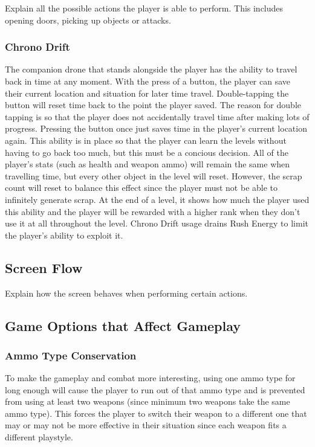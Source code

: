 \documentclass[12pt]{article}
\begin{document}
Explain all the possible actions the player is able to perform. This includes opening doors, picking up objects or attacks.

\subsubsection{Chrono Drift}

The companion drone that stands alongside the player has the ability to travel back in time at any moment. With the press of a button, the player can save their current location and situation for later time travel. Double-tapping the button will reset time back to the point the player saved. The reason for double tapping is so that the player does not accidentally travel time after making lots of progress. Pressing the button once just saves time in the player's current location again. This ability is in place so that the player can learn the levels without having to go back too much, but this must be a concious decision. All of the player's stats (such as health and weapon ammo) will remain the same when travelling time, but every other object in the level will reset. However, the scrap count will reset to balance this effect since the player must not be able to infinitely generate scrap. At the end of a level, it shows how much the player used this ability and the player will be rewarded with a higher rank when they don't use it at all throughout the level. Chrono Drift usage drains Rush Energy to limit the player's ability to exploit it.

\subsection{Screen Flow}

Explain how the screen behaves when performing certain actions.

\subsection{Game Options that Affect Gameplay}

\subsubsection{Ammo Type Conservation}

To make the gameplay and combat more interesting, using one ammo type for long enough will cause the player to run out of that ammo type and is prevented from using at least two weapons (since minimum two weapons take the same ammo type). This forces the player to switch their weapon to a different one that may or may not be more effective in their situation since each weapon fits a different playstyle. 
\end{document}
